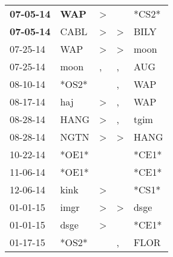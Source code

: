 \begin{supertabular}{p{0.07\textwidth}p{0.06\textwidth}p{0.02\textwidth}p{0.02\textwidth}p{0.06\textwidth}}
 \textbf{07-05-14\textsuperscript{}} &   \textbf{WAP\textsuperscript{}} &     \textgreater &                  &                            *CS2* \\
 \textbf{07-05-14\textsuperscript{}} &           CABL\textsuperscript{} &     \textgreater &     \textgreater &           BILY\textsuperscript{} \\
          07-25-14\textsuperscript{} &            WAP\textsuperscript{} &     \textgreater &     \textgreater &           moon\textsuperscript{} \\
          07-25-14\textsuperscript{} &           moon\textsuperscript{} &                , &                , &            AUG\textsuperscript{} \\
          08-10-14\textsuperscript{} &                            *OS2* &                  &                , &            WAP\textsuperscript{} \\
          08-17-14\textsuperscript{} &            haj\textsuperscript{} &     \textgreater &                , &            WAP\textsuperscript{} \\
          08-28-14\textsuperscript{} &           HANG\textsuperscript{} &     \textgreater &                , &           tgim\textsuperscript{} \\
          08-28-14\textsuperscript{} &           NGTN\textsuperscript{} &     \textgreater &     \textgreater &           HANG\textsuperscript{} \\
          10-22-14\textsuperscript{} &                            *OE1* &                  &                  &                            *CE1* \\
          11-06-14\textsuperscript{} &                            *OE1* &                  &                  &                            *CE1* \\
          12-06-14\textsuperscript{} &           kink\textsuperscript{} &     \textgreater &                  &                            *CS1* \\
          01-01-15\textsuperscript{} &           imgr\textsuperscript{} &     \textgreater &     \textgreater &           dsge\textsuperscript{} \\
          01-01-15\textsuperscript{} &           dsge\textsuperscript{} &     \textgreater &                  &                            *CE1* \\
          01-17-15\textsuperscript{} &                            *OS2* &                  &                , &           FLOR\textsuperscript{} \\

\end{supertabular}
